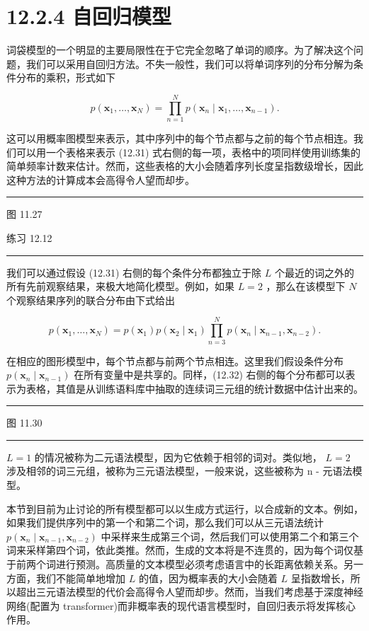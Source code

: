 \documentclass[10pt]{article}
\newcommand{\HRule}{\begin{center}\rule{0.9\linewidth}{0.2mm}\end{center}}
\begin{document}
\section*{12.2.4 自回归模型}

词袋模型的一个明显的主要局限性在于它完全忽略了单词的顺序。为了解决这个问题，我们可以采用自回归方法。不失一般性，我们可以将单词序列的分布分解为条件分布的乘积，形式如下

\[
p\left( {{\mathbf{x}}_{1},\ldots ,{\mathbf{x}}_{N}}\right)  = \mathop{\prod }\limits_{{n = 1}}^{N}p\left( {{\mathbf{x}}_{n} \mid  {\mathbf{x}}_{1},\ldots ,{\mathbf{x}}_{n - 1}}\right) . \tag{12.31}
\]

这可以用概率图模型来表示，其中序列中的每个节点都与之前的每个节点相连。我们可以用一个表格来表示 (12.31) 式右侧的每一项，表格中的项同样使用训练集的简单频率计数来估计。然而，这些表格的大小会随着序列长度呈指数级增长，因此这种方法的计算成本会高得令人望而却步。

\HRule

图 11.27

练习 12.12

\HRule

我们可以通过假设 (12.31) 右侧的每个条件分布都独立于除 \(L\) 个最近的词之外的所有先前观察结果，来极大地简化模型。例如，如果 \(L = 2\) ，那么在该模型下 \(N\) 个观察结果序列的联合分布由下式给出

\[
p\left( {{\mathbf{x}}_{1},\ldots ,{\mathbf{x}}_{N}}\right)  = p\left( {\mathbf{x}}_{1}\right) p\left( {{\mathbf{x}}_{2} \mid  {\mathbf{x}}_{1}}\right) \mathop{\prod }\limits_{{n = 3}}^{N}p\left( {{\mathbf{x}}_{n} \mid  {\mathbf{x}}_{n - 1},{\mathbf{x}}_{n - 2}}\right) . \tag{12.32}
\]

在相应的图形模型中，每个节点都与前两个节点相连。这里我们假设条件分布 \(p\left( {{\mathbf{x}}_{n} \mid  {\mathbf{x}}_{n - 1}}\right)\) 在所有变量中是共享的。同样，(12.32) 右侧的每个分布都可以表示为表格，其值是从训练语料库中抽取的连续词三元组的统计数据中估计出来的。

\HRule

图 11.30

\HRule

\(L = 1\) 的情况被称为二元语法模型，因为它依赖于相邻的词对。类似地， \(L = 2\) 涉及相邻的词三元组，被称为三元语法模型，一般来说，这些被称为 n - 元语法模型。

本节到目前为止讨论的所有模型都可以以生成方式运行，以合成新的文本。例如，如果我们提供序列中的第一个和第二个词，那么我们可以从三元语法统计 \(p\left( {{\mathbf{x}}_{n} \mid  {\mathbf{x}}_{n - 1},{\mathbf{x}}_{n - 2}}\right)\) 中采样来生成第三个词，然后我们可以使用第二个和第三个词来采样第四个词，依此类推。然而，生成的文本将是不连贯的，因为每个词仅基于前两个词进行预测。高质量的文本模型必须考虑语言中的长距离依赖关系。另一方面，我们不能简单地增加 \(L\) 的值，因为概率表的大小会随着 \(L\) 呈指数增长，所以超出三元语法模型的代价会高得令人望而却步。然而，当我们考虑基于深度神经网络(配置为 transformer)而非概率表的现代语言模型时，自回归表示将发挥核心作用。
\end{document}
